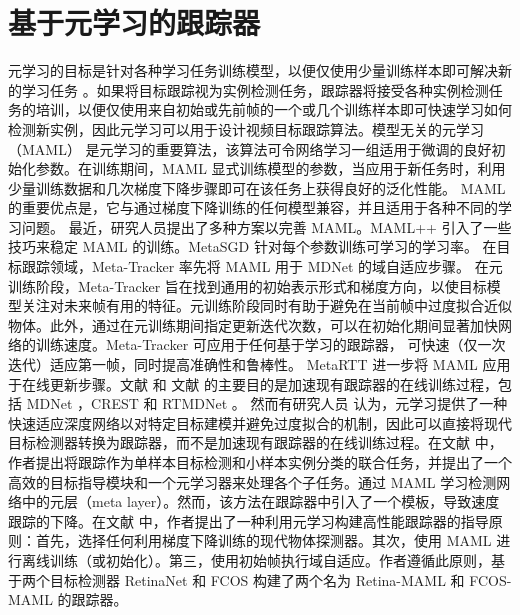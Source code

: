 \section{基于元学习的跟踪器} %
元学习的目标是针对各种学习任务训练模型，以便仅使用少量训练样本即可解决新的学习任务 \cite{MAML}。如果将目标跟踪视为实例检测任务，跟踪器将接受各种实例检测任务的培训，以便仅使用来自初始或先前帧的一个或几个训练样本即可快速学习如何检测新实例，因此元学习可以用于设计视频目标跟踪算法。模型无关的元学习（MAML）\cite{MAML} 是元学习的重要算法，该算法可令网络学习一组适用于微调的良好初始化参数。在训练期间，MAML 显式训练模型的参数，当应用于新任务时，利用少量训练数据和几次梯度下降步骤即可在该任务上获得良好的泛化性能。 MAML 的重要优点是，它与通过梯度下降训练的任何模型兼容，并且适用于各种不同的学习问题。
最近，研究人员提出了多种方案以完善 MAML。MAML++ \cite{MAML++} 引入了一些技巧来稳定 MAML 的训练。MetaSGD \cite{MetaSGD} 针对每个参数训练可学习的学习率。
在目标跟踪领域，Meta-Tracker \cite{MetaTracker} 率先将 MAML 用于 MDNet \cite{MDNet} 的域自适应步骤。
在元训练阶段，Meta-Tracker 旨在找到通用的初始表示形式和梯度方向，以使目标模型关注对未来帧有用的特征。元训练阶段同时有助于避免在当前帧中过度拟合近似物体。此外，通过在元训练期间指定更新迭代次数，可以在初始化期间显著加快网络的训练速度。Meta-Tracker 可应用于任何基于学习的跟踪器，
可快速（仅一次迭代）适应第一帧，同时提高准确性和鲁棒性。
MetaRTT \cite{MetaRTT} 进一步将 MAML 应用于在线更新步骤。文献 \cite{MetaTracker} 和 文献 \cite{MetaRTT} 的主要目的是加速现有跟踪器的在线训练过程，包括 MDNet \cite{MDNet}，CREST \cite{CREST} 和 RTMDNet \cite{RTMDNet}。
然而有研究人员 \cite{huang2019bridging} 认为，元学习提供了一种快速适应深度网络以对特定目标建模并避免过度拟合的机制，因此可以直接将现代目标检测器转换为跟踪器，而不是加速现有跟踪器的在线训练过程。在文献 \cite{huang2019bridging} 中，作者提出将跟踪作为单样本目标检测和小样本实例分类的联合任务，并提出了一个高效的目标指导模块和一个元学习器来处理各个子任务。通过 MAML 学习检测网络中的元层（meta layer）。然而，该方法在跟踪器中引入了一个模板，导致速度跟踪的下降。在文献 \cite{TrackingBy} 中，作者提出了一种利用元学习构建高性能跟踪器的指导原则：首先，选择任何利用梯度下降训练的现代物体探测器。其次，使用 MAML 进行离线训练（或初始化）。第三，使用初始帧执行域自适应。作者遵循此原则，基于两个目标检测器 RetinaNet \cite{focal} 和 FCOS \cite{tian2019fcos} 构建了两个名为 Retina-MAML 和 FCOS-MAML 的跟踪器。

